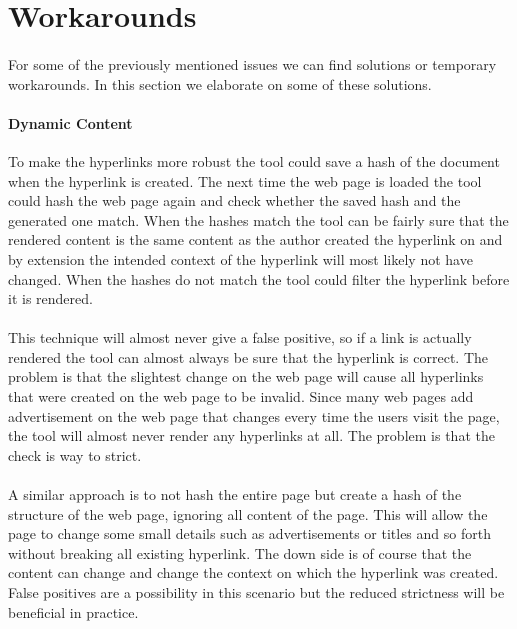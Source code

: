 	\section{Workarounds} \label{sub:Workarounds}
	\paragraph{}
	For some of the previously mentioned issues we can find solutions or temporary workarounds. In this section we elaborate on some of these solutions.
	\paragraph{Dynamic Content}
	To make the hyperlinks more robust the tool could save a hash of the document when the hyperlink is created. The next time the web page is loaded the tool could hash the web page again and check whether the saved hash and the generated one match. When the hashes match the tool can be fairly sure that the rendered content is the same content as the author created the hyperlink on and by extension the intended context of the hyperlink will most likely not have changed. When the hashes do not match the tool could filter the hyperlink before it is rendered.
	\paragraph{}
	This technique will almost never give a false positive, so if a link is actually rendered the tool can almost always be sure that the hyperlink is correct. The problem is that the slightest change on the web page will cause all hyperlinks that were created on the web page to be invalid. Since many web pages add advertisement on the web page that changes every time the users visit the page, the tool will almost never render any hyperlinks at all. The problem is that the check is way to strict.
	\paragraph{}
	A similar approach is to not hash the entire page but create a hash of the structure of the web page, ignoring all content of the page. This will allow the page to change some small details such as advertisements or titles and so forth without breaking all existing hyperlink. The down side is of course that the content can change and change the context on which the hyperlink was created. False positives are a possibility in this scenario but the reduced strictness will be beneficial in practice.

